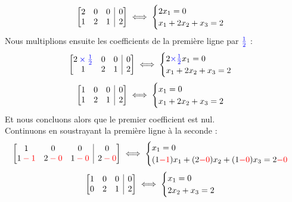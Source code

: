 \documentclass{article}
\begin{document}
$$ 
\left[
\begin{array}{@{}ccc|c@{}}
2 & 0 & 0 & 0 \\
1 & 2 & 1 & 2 \\
\end{array}
\right]
\iff
\begin{cases}
2x_1 = 0\\
x_1 + 2x_2 + x_3 = 2
\end{cases}
$$
Nous multiplions ensuite les coefficients de la première ligne par $\color{blue}\frac{1}{2}$ :
$$ 
\left[
\begin{array}{@{}ccc|c@{}}
2 \color{blue}\times\frac{1}{2}  & 0 & 0 & 0 \\
1 & 2 & 1 & 2 \\
\end{array}
\right]
\iff
\begin{cases}
2\textcolor{blue}{\times \frac{1}{2}}x_1 = 0\\
x_1 + 2x_2 + x_3 = 2
\end{cases}
$$
$$ 
\left[
\begin{array}{@{}ccc|c@{}}
1 & 0 & 0 & 0 \\
1 & 2 & 1 & 2 \\
\end{array}
\right]
\iff
\begin{cases}
x_1 = 0 \\
x_1 + 2x_2 + x_3 = 2
\end{cases}
$$
Et nous concluons alors que le premier coefficient est nul.\\
Continuons en soustrayant la première ligne à la seconde :
$$ 
\left[
\begin{array}{@{}ccc|c@{}}
1 & 0 & 0 & 0 \\
1\color{red} - 1 & 2\color{red} - 0 & 1\color{red} - 0 & 2\color{red} - 0 \\
\end{array}
\right]
\iff 
\begin{cases}
x_1 = 0 \\
(1\textcolor{red}{-1})x_1 + (2\textcolor{red}{-0})x_2 + (1\textcolor{red}{-0})x_3 = 2\textcolor{red}{-0}
\end{cases}
$$
$$ 
\left[
\begin{array}{@{}ccc|c@{}}
1 & 0 & 0 & 0 \\
0 & 2 & 1 & 2 \\
\end{array}
\right]
\iff
\begin{cases}
x_1 = 0 \\
2x_2 + x_3 = 2
\end{cases}
$$
\end{document}
